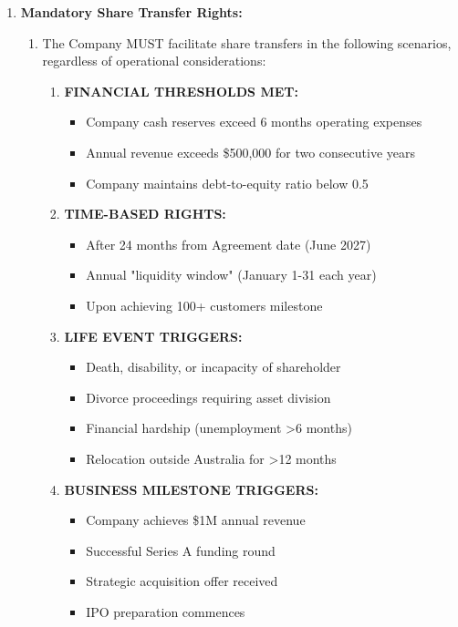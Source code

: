 \begin{enumerate}[label=(\alph*)]
\item \textbf{Mandatory Share Transfer Rights:}
    \begin{enumerate}[label=(\roman*)]
    \item The Company MUST facilitate share transfers in the following scenarios, regardless of operational considerations:
        \begin{enumerate}[label=(\Alph*)]
        \item \textbf{FINANCIAL THRESHOLDS MET:}
            \begin{itemize}
            \item Company cash reserves exceed 6 months operating expenses
            \item Annual revenue exceeds \$500,000 for two consecutive years
            \item Company maintains debt-to-equity ratio below 0.5
            \end{itemize}
        \item \textbf{TIME-BASED RIGHTS:}
            \begin{itemize}
            \item After 24 months from Agreement date (June 2027)
            \item Annual "liquidity window" (January 1-31 each year)
            \item Upon achieving 100+ customers milestone
            \end{itemize}
        \item \textbf{LIFE EVENT TRIGGERS:}
            \begin{itemize}
            \item Death, disability, or incapacity of shareholder
            \item Divorce proceedings requiring asset division
            \item Financial hardship (unemployment >6 months)
            \item Relocation outside Australia for >12 months
            \end{itemize}
        \item \textbf{BUSINESS MILESTONE TRIGGERS:}
            \begin{itemize}
            \item Company achieves \$1M annual revenue
            \item Successful Series A funding round
            \item Strategic acquisition offer received
            \item IPO preparation commences
            \end{itemize}
        \end{enumerate}
    \end{enumerate}


\end{enumerate}
